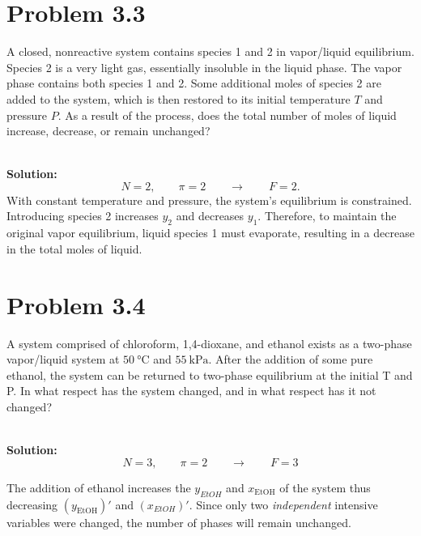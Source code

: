 \documentclass{article}
\newenvironment{solution}{\par\noindent\textbf{\\Solution:\\}}{\par\medskip}
\begin{document}
\section*{Problem 3.3}
A closed, nonreactive system contains species 1 and 2 in vapor/liquid equilibrium. Species 2 is a very light gas, essentially insoluble in the liquid phase. The vapor phase contains both species 1 and 2. Some additional moles of species 2 are added to the system, which is then restored to its initial temperature \( T \) and pressure \( P \). As a result of the process, does the total number of moles of liquid increase, decrease, or remain unchanged?

\begin{solution}
    \begin{equation*}
        N=2, \qquad \pi=2 \qquad \to \qquad F=2.
    \end{equation*}
    With constant temperature and pressure, the system's equilibrium is constrained. Introducing species 2 increases $y_2$ and decreases $y_1$. Therefore, to maintain the original vapor equilibrium, liquid species 1 must evaporate, resulting in a decrease in the total moles of liquid.

\end{solution}

\section*{Problem 3.4}
A system comprised of chloroform, 1,4-dioxane, and ethanol exists as a two-phase vapor/liquid system at $50~\unit{ \degreeCelsius }$ and $55~\unit{ \kilo\pascal }$. After the addition of some pure ethanol, the system can be returned to two-phase equilibrium at the initial T and P. In what respect has the system changed, and in what respect has it not changed?

\begin{solution}
    \begin{equation*}
        N=3, \qquad \pi=2 \qquad \to \qquad F=3
    \end{equation*}

    The addition of ethanol increases the $y_{EtOH}$ and $x_{\text{EtOH}}$ of the system thus decreasing $\left( y_{\text{EtOH}} \right)'$ and $\left( x_{EtOH} \right)'$. Since only two \textit{independent} intensive variables were changed, the number of phases will remain unchanged. 
\end{solution}
\end{document}
